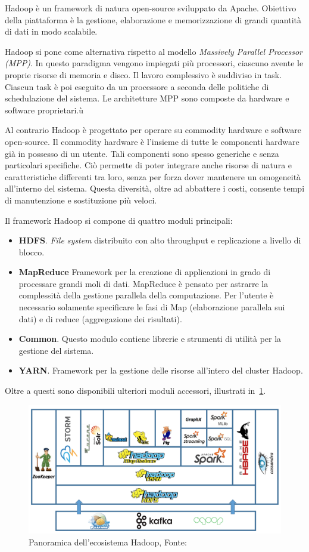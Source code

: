 Hadoop è un framework di natura open-source sviluppato da Apache.
Obiettivo della piattaforma è la gestione, elaborazione e memorizzazione di grandi quantità di dati in modo scalabile.

Hadoop si pone come alternativa rispetto al modello \textit{Massively Parallel Processor (MPP)}.
In questo paradigma vengono impiegati più processori, ciascuno avente le proprie risorse di memoria e disco.
Il lavoro complessivo è suddiviso in task.
Ciascun task è poi eseguito da un processore a seconda delle politiche di schedulazione del sistema.
Le architetture MPP sono composte da hardware e software proprietari.ù

Al contrario Hadoop è progettato per operare su commodity hardware e software open-source.
Il commodity hardware è l'insieme di tutte le componenti hardware già in possesso di un utente.
Tali componenti sono spesso generiche e senza particolari specifiche.
Ciò permette di poter integrare anche risorse di natura e caratteristiche differenti tra loro, senza per forza dover mantenere un omogeneità all'interno del sistema.
Questa diversità, oltre ad abbattere i costi, consente tempi di manutenzione e sostituzione più veloci.

Il framework Hadoop si compone di quattro moduli principali:

\begin{itemize}
    \item \textbf{HDFS}.
    \textit{File system} distribuito con alto throughput e replicazione a livello di blocco.
    \item \textbf{MapReduce} Framework per la creazione di applicazioni in grado di processare grandi moli di dati. 
    MapReduce è pensato per astrarre la complessità della gestione parallela della computazione.
    Per l'utente è necessario solamente specificare le fasi di Map (elaborazione parallela sui dati) e di reduce (aggregazione dei risultati).
    \item \textbf{Common}. Questo modulo contiene librerie e strumenti di utilità per la gestione del sistema.
    \item \textbf{YARN}. Framework per la gestione delle risorse all'intero del cluster Hadoop.
\end{itemize}

Oltre a questi sono disponibili ulteriori moduli accessori, illustrati in~\cref{fig:chap-6:hadoop-modules}.

\begin{figure}
    \centering
    \includegraphics[width=\textwidth]{res/fig/sec-6/HadoopStack.pdf}
    \caption{Panoramica dell'ecosistema Hadoop, Fonte: \cite{Introduc53:online}}%
    \label{fig:chap-6:hadoop-modules}
\end{figure}